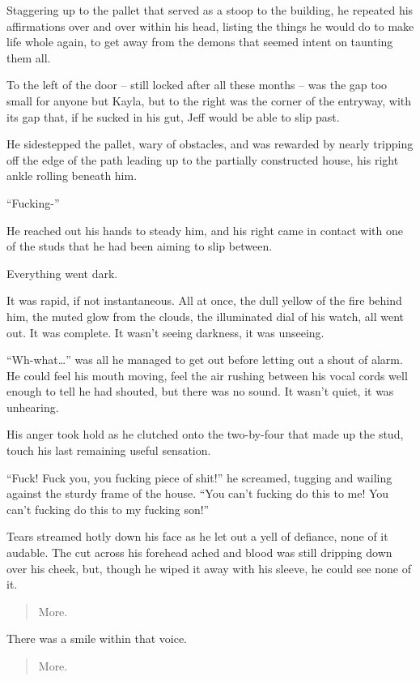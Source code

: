 Staggering up to the pallet that served as a stoop to the building, he repeated his affirmations over and over within his head, listing the things he would do to make life whole again, to get away from the demons that seemed intent on taunting them all.

To the left of the door -- still locked after all these months -- was the gap too small for anyone but Kayla, but to the right was the corner of the entryway, with its gap that, if he sucked in his gut, Jeff would be able to slip past.

He sidestepped the pallet, wary of obstacles, and was rewarded by nearly tripping off the edge of the path leading up to the partially constructed house, his right ankle rolling beneath him.

``Fucking-''

He reached out his hands to steady him, and his right came in contact with one of the studs that he had been aiming to slip between.

Everything went dark.

It was rapid, if not instantaneous.  All at once, the dull yellow of the fire behind him, the muted glow from the clouds, the illuminated dial of his watch, all went out.  It was complete.  It wasn't seeing darkness, it was unseeing.

``Wh-what\ldots{}'' was all he managed to get out before letting out a shout of alarm.  He could feel his mouth moving, feel the air rushing between his vocal cords well enough to tell he had shouted, but there was no sound.  It wasn't quiet, it was unhearing.

His anger took hold as he clutched onto the two-by-four that made up the stud, touch his last remaining useful sensation.

``Fuck!  Fuck you, you fucking piece of shit!'' he screamed, tugging and wailing against the sturdy frame of the house.  ``You can't fucking do this to me!  You can't fucking do this to my fucking son!''

Tears streamed hotly down his face as he let out a yell of defiance, none of it audable.  The cut across his forehead ached and blood was still dripping down over his cheek, but, though he wiped it away with his sleeve, he could see none of it.

\begin{quote}
  More.
\end{quote}

There was a smile within that voice.

\begin{quote}
  More.
\end{quote}
